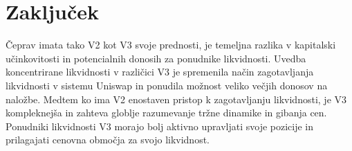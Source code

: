 \documentclass[a4paper,12pt]{article}%
\begin{document}
\section{Zaključek}

Čeprav imata tako V2 kot V3 svoje prednosti, je temeljna razlika v kapitalski učinkovitosti in potencialnih donosih za ponudnike likvidnosti. Uvedba koncentrirane likvidnosti v različici V3 je spremenila način zagotavljanja likvidnosti v sistemu Uniswap in ponudila možnost veliko večjih donosov na naložbe. Medtem ko ima V2 enostaven pristop k zagotavljanju likvidnosti, je V3 kompleknejša in zahteva globlje razumevanje tržne dinamike in gibanja cen. Ponudniki likvidnosti V3 morajo bolj aktivno upravljati svoje pozicije in prilagajati cenovna območja za svojo likvidnost. 




\end{document}
